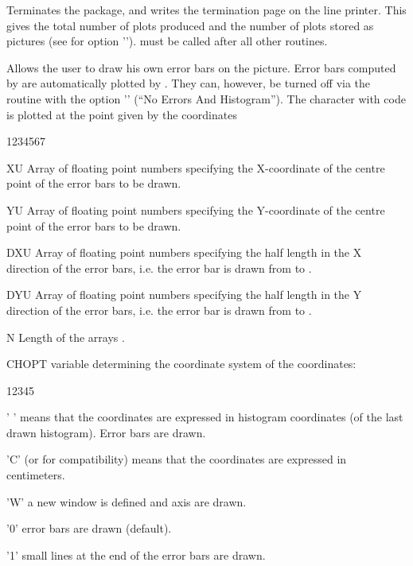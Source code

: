 \Action
Terminates the  package, and writes the termination page on the line
printer. This gives the total number of plots produced and the number of plots
stored as \HIGZ{} pictures (see  for option '').
\Remark
{} must be called after all other \HPLOT{} routines.


\Action
Allows the user to draw his own error bars on the picture. Error bars computed
by \HBOOK{} are automatically plotted by \HPLOT. They can, however, be turned
off via the routine  with the option '' (``No Errors And
Histogram''). The character with code  is plotted at the point given
by the coordinates 
\Pdesc
\begin{DLtt}{1234567}
\item[XU]    Array of floating point numbers specifying the X-coordinate of the
             centre point of the error bars to be drawn.
\item[YU]    Array of floating point numbers specifying the Y-coordinate of the
             centre point of the error bars to be drawn.
\item[DXU]   Array of floating point numbers specifying the half length in the X
             direction of the error bars, i.e. the error bar is drawn from
              to .
\item[DYU]   Array of floating point numbers specifying the half length in the Y
             direction of the error bars, i.e. the error bar is drawn from
              to .
\item[N]     Length of the arrays .
\item[CHOPT] \CHARACTER{} variable determining the coordinate system of the
              coordinates:
\begin{DLtt}{12345}
  \item[' '] means that the coordinates are expressed in histogram coordinates
             (of the last drawn histogram). Error bars are drawn.
  \item['C'] (or  for compatibility) means that the coordinates are
             expressed in centimeters.
  \item['W'] a new window is defined and axis are drawn.
  \item['0'] error bars are drawn (default).
  \item['1'] small lines at the end of the error bars are drawn.

\end{DLtt}
\end{DLtt}
